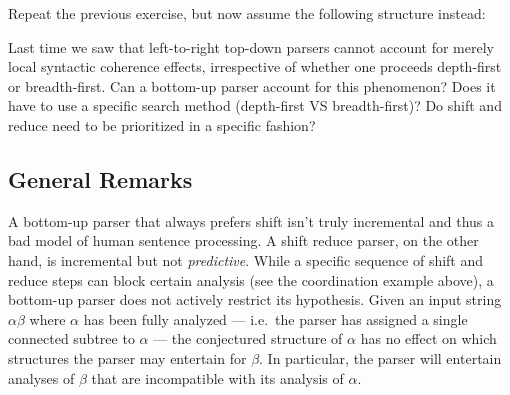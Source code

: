 \begin{exercise}
    Repeat the previous exercise, but now assume the following structure instead:
    \begin{center}
    \end{center}
    \label{ex:BottomUp_RightEmbedding}
\end{exercise}

\begin{exercise}
    Last time we saw that left-to-right top-down parsers cannot account for merely local syntactic coherence effects, irrespective of whether one proceeds depth-first or breadth-first.
    Can a bottom-up parser account for this phenomenon?
    Does it have to use a specific search method (depth-first VS breadth-first)?
    Do shift and reduce need to be prioritized in a specific fashion?
\end{exercise}

\subsection{General Remarks}
\label{sub:BottomUp_Remarks}

A bottom-up parser that always prefers shift isn't truly incremental and thus a bad model of human sentence processing.
A shift reduce parser, on the other hand, is incremental but not \emph{predictive}.
While a specific sequence of shift and reduce steps can block certain analysis (see the coordination example above), a bottom-up parser does not actively restrict its hypothesis.
Given an input string $\alpha\beta$ where $\alpha$ has been fully analyzed --- i.e.\ the parser has assigned a single connected subtree to $\alpha$ --- the conjectured structure of $\alpha$ has no effect on which structures the parser may entertain for $\beta$.
In particular, the parser will entertain analyses of $\beta$ that are incompatible with its analysis of $\alpha$.

